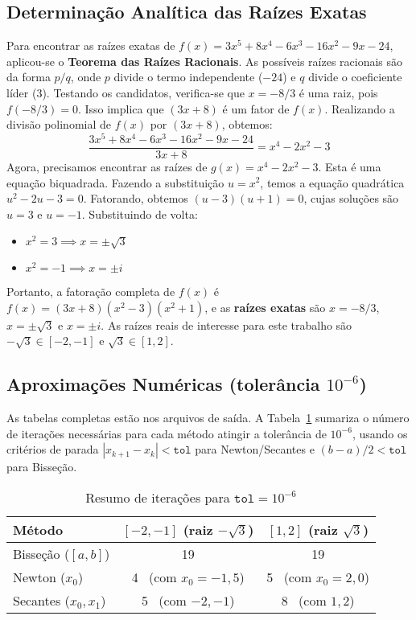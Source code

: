 \documentclass[12pt,a4paper]{article}
\begin{document}
\subsection{Determinação Analítica das Raízes Exatas}
Para encontrar as raízes exatas de $f(x)=3x^{5}+8x^{4}-6x^{3}-16x^{2}-9x-24$, aplicou-se o \textbf{Teorema das Raízes Racionais}. As possíveis raízes racionais são da forma $p/q$, onde $p$ divide o termo independente ($-24$) e $q$ divide o coeficiente líder ($3$). Testando os candidatos, verifica-se que $x = -8/3$ é uma raiz, pois $f(-8/3)=0$.
Isso implica que $(3x+8)$ é um fator de $f(x)$. Realizando a divisão polinomial de $f(x)$ por $(3x+8)$, obtemos:
\[
\frac{3x^{5}+8x^{4}-6x^{3}-16x^{2}-9x-24}{3x+8} = x^4 - 2x^2 - 3
\]
Agora, precisamos encontrar as raízes de $g(x) = x^4 - 2x^2 - 3$. Esta é uma equação biquadrada. Fazendo a substituição $u=x^2$, temos a equação quadrática $u^2 - 2u - 3 = 0$. Fatorando, obtemos $(u-3)(u+1) = 0$, cujas soluções são $u=3$ e $u=-1$.
Substituindo de volta:
\begin{itemize}
    \item $x^2 = 3 \implies x = \pm\sqrt{3}$
    \item $x^2 = -1 \implies x = \pm i$
\end{itemize}
Portanto, a fatoração completa de $f(x)$ é $f(x)=(3x+8)(x^2-3)(x^2+1)$, e as \textbf{raízes exatas} são $x = -8/3$, $x = \pm\sqrt{3}$ e $x = \pm i$. As raízes reais de interesse para este trabalho são $-\sqrt{3} \in [-2,-1]$ e $\sqrt{3} \in [1,2]$.

\subsection{Aproximações Numéricas (tolerância $10^{-6}$)}
As tabelas completas estão nos arquivos de saída. A Tabela~\ref{tab:resumo} sumariza o número de iterações necessárias para cada método atingir a tolerância de $10^{-6}$, usando os critérios de parada $|x_{k+1}-x_k|<\texttt{tol}$ para Newton/Secantes e $(b-a)/2<\texttt{tol}$ para Bisseção.

\begin{table}[H]
\centering
\caption{Resumo de iterações para $\texttt{tol}=10^{-6}$}
\label{tab:resumo}
\begin{tabular}{lcc}
\toprule
Método & $[-2,-1]$ (raiz $-\sqrt{3}$) & $[1,2]$ (raiz $\sqrt{3}$) \\
\midrule
Bisseção ($[a,b]$) & 19 & 19 \\
Newton ($x_0$) & 4 \, (com $x_0=-1{,}5$) & 5 \, (com $x_0=2{,}0$) \\
Secantes ($x_0,x_1$) & 5 \, (com $-2,-1$) & 8 \, (com $1,2$) \\
\bottomrule
\end{tabular}
\end{table}
\end{document}

